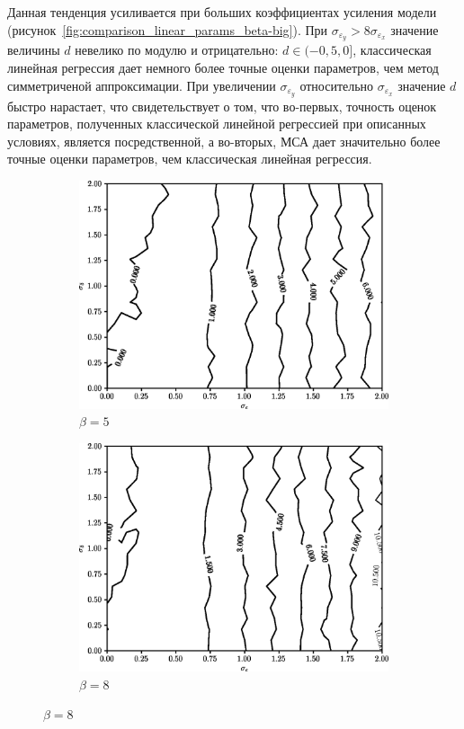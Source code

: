 Данная тенденция усиливается при больших коэффициентах усиления модели
(рисунок~\ref{fig:comparison_linear_params_beta-big}).
При \( \sigma_{\varepsilon_y} > 8\sigma_{\varepsilon_x} \)
значение величины \( d \) невелико по модулю и отрицательно: \( d \in ( -0{,}5, 0 ] \),
классическая линейная регрессия дает немного более точные оценки параметров,
чем метод симметриченой аппроксимации.
При увеличении \( \sigma_{\varepsilon_y} \) относительно \( \sigma_{\varepsilon_x} \) значение
\( d \) быстро нарастает, что свидетельствует о том, что во-первых,
точность оценок параметров, полученных классической линейной регрессией при описанных условиях,
является посредственной,
а во-вторых, МСА дает значительно более точные оценки параметров,
чем классическая линейная регрессия.

\begin{figure}[p]
  \begin{subfigure}[b]{\linewidth}
    \centering
    \includegraphics[width=135mm]{fig/linear/param/beta-5_param}
    \caption{\( \beta = 5 \)}
  \end{subfigure}

  \vspace{2\baselineskip}
  \begin{subfigure}[b]{\linewidth}
    \centering
    \includegraphics[width=135mm]{fig/linear/param/beta-8_param}
    \caption{\( \beta = 8 \)}
  \end{subfigure}


\end{figure}
